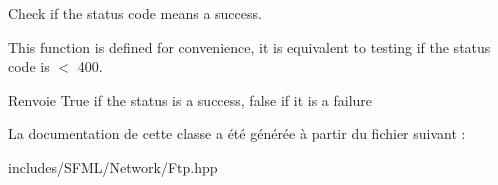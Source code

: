 Check if the status code means a success. 

This function is defined for convenience, it is equivalent to testing if the status code is $<$ 400.

\begin{DoxyReturn}{Renvoie}
True if the status is a success, false if it is a failure 
\end{DoxyReturn}


La documentation de cette classe a été générée à partir du fichier suivant \+:\begin{DoxyCompactItemize}
\item 
includes/\+S\+F\+M\+L/\+Network/Ftp.\+hpp\end{DoxyCompactItemize}
